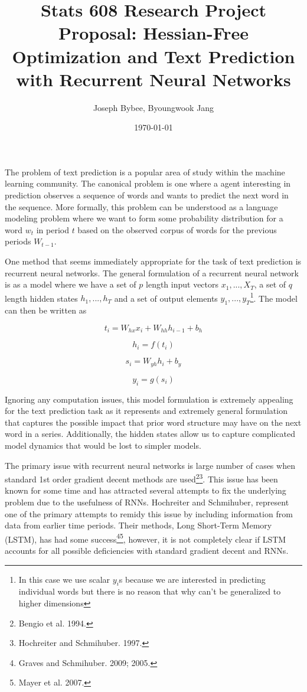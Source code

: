 \documentclass{article}
\begin{document}
\title{Stats 608 Research Project Proposal: Hessian-Free Optimization and Text Prediction with Recurrent Neural Networks}
\author{Joseph Bybee, Byoungwook Jang}
\date{\today}

\maketitle

The problem of text prediction is a popular area of study within the machine learning community.  The canonical problem is one where a agent interesting in prediction observes a sequence of words and wants to predict the next word in the sequence.  More formally, this problem can be understood as a language modeling problem where we want to form some probability distribution for a word $w_t$ in period $t$ based on the observed corpus of words for the previous periods $W_{t-1}$.

One method that seems immediately appropriate for the task of text prediction is recurrent neural networks.  The general formulation of a recurrent neural network is as a model where we have a set of $p$ length input vectors $x_1,...,X_T$, a set of $q$ length hidden states $h_1,...,h_T$ and a set of output elements $y_1,...,y_T$\footnote{In this case we use scalar $y_i$s because we are interested in predicting individual words but there is no reason that why can't be generalized to higher dimensions}.  The model can then be written as

\[t_i = W_{hx} x_i + W_{hh} h_{i-1} + b_h\]

\[h_i = f(t_i)\]

\[s_i = W_{yh} h_i + b_y\]

\[y_i = g(s_i)\]

Ignoring any computation issues, this model formulation is extremely appealing for the text prediction task as it represents and extremely general formulation that captures the possible impact that prior word structure may have on the next word in a series.  Additionally, the hidden states allow us to capture complicated model dynamics that would be lost to simpler models.

The primary issue with recurrent neural networks is large number of cases when standard 1st order gradient decent methods are used\footnote{Bengio et al. 1994.}\footnote{Hochreiter and Schmihuber. 1997.}.  This issue has been known for some time and has attracted several attempts to fix the underlying problem due to the usefulness of RNNs.  Hochreiter and Schmihuber, represent one of the primary attempts to remidy this issue by including information from data from earlier time periods.  Their methods, Long Short-Term Memory (LSTM), has had some success\footnote{Graves and Schmihuber. 2009; 2005.}\footnote{Mayer et al. 2007.}, however, it is not completely clear if LSTM accounts for all possible deficiencies with standard gradient decent and RNNs.
\end{document}
